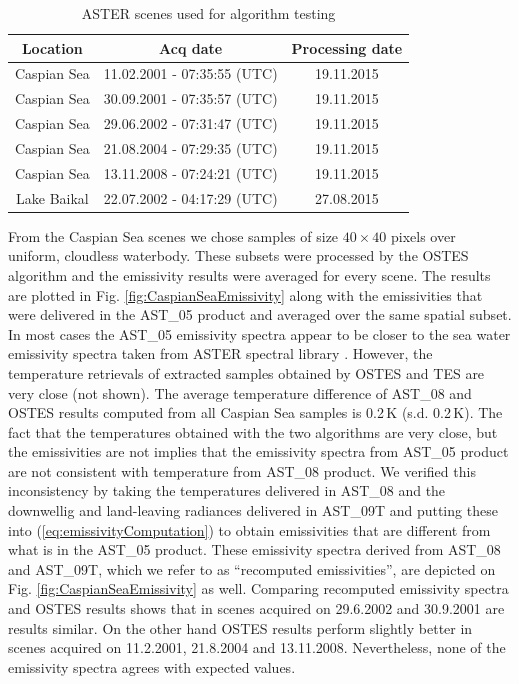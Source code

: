 \begin{table}[thb]
\vspace{0.5em}
\footnotesize
\centering
\begin{tabular}{ccc}
\toprule
Location & Acq date & Processing date \\ \hline
Caspian Sea & 11.02.2001 - 07:35:55 (UTC) & 19.11.2015 \\
Caspian Sea & 30.09.2001 - 07:35:57 (UTC) & 19.11.2015 \\
Caspian Sea & 29.06.2002 - 07:31:47 (UTC) & 19.11.2015 \\
Caspian Sea & 21.08.2004 - 07:29:35 (UTC) & 19.11.2015 \\
Caspian Sea & 13.11.2008 - 07:24:21 (UTC) & 19.11.2015 \\
Lake Baikal & 22.07.2002 - 04:17:29 (UTC) & 27.08.2015 \\
\bottomrule
\end{tabular}
\vspace{1.5 em}
\caption{ASTER scenes used for algorithm testing}
\label{table:ASTERScenes}
\normalsize
\end{table}

From the Caspian Sea scenes we chose samples of size $40 \times 40$ pixels over uniform, cloudless waterbody. These subsets were processed by the OSTES algorithm and the emissivity results were averaged for every scene. The results are plotted in Fig. \ref{fig:CaspianSeaEmissivity} along with the emissivities that were delivered in the AST\_05 product and averaged over the same spatial subset. In most cases the AST\_05 emissivity spectra appear to be closer to the sea water emissivity spectra taken from ASTER spectral library \cite{BH09}. However, the temperature retrievals of extracted samples obtained by OSTES and TES are very close (not shown). The average temperature difference of AST\_08 and OSTES results computed from all Caspian Sea samples is 0.2\,K (s.d. 0.2\,K). The fact that the temperatures obtained with the two algorithms are very close, but the emissivities are not implies that the emissivity spectra from AST\_05 product are not consistent with temperature from AST\_08 product. We verified this inconsistency by taking the temperatures delivered in AST\_08 and the downwellig and land-leaving radiances delivered in AST\_09T and putting these into (\ref{eq:emissivityComputation}) to obtain emissivities that are different from what is in the AST\_05 product. These emissivity spectra derived from AST\_08 and AST\_09T, which we refer to as ``recomputed emissivities'', are depicted on Fig. \ref{fig:CaspianSeaEmissivity} as well. Comparing recomputed emissivity spectra and OSTES results shows that in scenes acquired on 29.6.2002 and 30.9.2001 are results similar. On the other hand OSTES results perform slightly better in scenes acquired on 11.2.2001, 21.8.2004 and 13.11.2008. Nevertheless, none of the emissivity spectra agrees with expected values.


